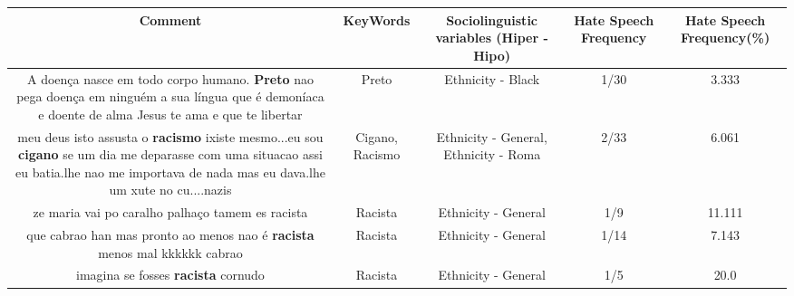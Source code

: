 \documentclass[11pt]{article}
\newlength\mylength
\begin{document}
\begin{center}
\setlength\mylength{\dimexpr\textwidth - 1\arrayrulewidth - 50\tabcolsep}
\begin{longtable}{|C{.65\mylength}|C{.30\mylength}|C{.12\mylength}|C{.12\mylength}|C{.12\mylength}|}
\hline
\textbf{Comment} & \textbf{KeyWords} & \textbf{Sociolinguistic variables (Hiper - Hipo)}  & \textbf{Hate Speech Frequency} & \textbf{Hate Speech Frequency(\%)} \\
\hline{}\small A doença nasce em todo corpo humano. \textbf{Preto} nao pega doença em ninguém a sua língua que  é demoníaca e doente de alma Jesus te ama e que te libertar\normalsize   & Preto & Ethnicity - Black & 1/30 & 3.333 \\  \hline
  \small meu deus isto assusta o \textbf{racismo} ixiste mesmo...eu sou \textbf{cigano} se um dia me deparasse com uma situacao assi eu batia.lhe nao me importava de nada mas eu dava.lhe um xute no cu....nazis\normalsize   & Cigano, Racismo & Ethnicity - General, Ethnicity - Roma & 2/33 & 6.061 \\  \hline
  \small ze maria vai po caralho palhaço tamem es racista\normalsize   & Racista & Ethnicity - General & 1/9 & 11.111 \\  \hline
  \small que cabrao han mas pronto ao menos nao é \textbf{racista} menos mal kkkkkk cabrao\normalsize   & Racista & Ethnicity - General & 1/14 & 7.143 \\  \hline
  \small imagina se fosses \textbf{racista} cornudo\normalsize   & Racista & Ethnicity - General & 1/5 & 20.0 \\  \hline
  
\end{longtable}
\end{center}
\end{document}
